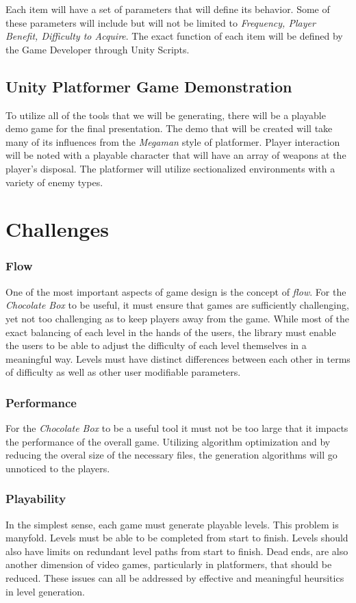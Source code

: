 \documentclass[pdftex,12pt,letter]{article}
\begin{document}
\begin{itemize}
\begin{itemize}
\begin{itemize}
\endgroup

Each item will have a set of parameters that will define its behavior. Some of these parameters will include but will not be limited to \textit{Frequency, Player Benefit, Difficulty to Acquire}. The exact function of each item will be defined by the Game Developer through Unity Scripts. 
\\

\subsection{Unity Platformer Game Demonstration}
To utilize all of the tools that we will be generating, there will be a playable demo game for the final presentation. The demo that will be created will take many of its influences from the \textit{Megaman} style of platformer.  Player interaction will be noted with a playable character that will have an array of weapons at the player's disposal. The platformer will utilize sectionalized environments with a variety of enemy types. 
\\

\section{Challenges}
\subsubsection{Flow}
One of the most important aspects of game design is the concept of \textit{flow}.  For the \textit{Chocolate Box} to be useful, it must ensure that games are sufficiently challenging, yet not too challenging as to keep players away from the game. While most of the  exact balancing of each level in the hands of the users, the library must enable the users to be able to adjust the difficulty of each level themselves in a meaningful way. Levels must have distinct differences between each other in terms of difficulty as well as other user modifiable parameters. 
\subsubsection{Performance}
For the \textit{Chocolate Box} to be a useful tool it must not be too large that it impacts the performance of the overall game. Utilizing algorithm optimization and by reducing the overal size of the necessary files, the generation algorithms will go unnoticed to the players. 
\subsubsection{Playability}
In the simplest sense, each game must generate playable levels. This problem is manyfold. Levels must be able to be completed from start to finish. Levels should also have limits on redundant level paths from start to finish. Dead ends, are also another dimension of video games, particularly in platformers, that should be reduced. These issues can all be addressed by effective and meaningful heursitics in level generation.

\end{itemize}
\end{itemize}
\end{itemize}
\end{document}
